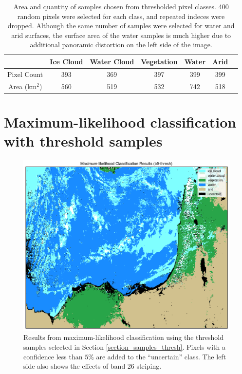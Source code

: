 \documentclass[12pt]{article}
\begin{document}
\begin{table}[h!]
    \centering
    \begin{tabular}{c|cccccc}
    & Ice Cloud & Water Cloud & Vegetation & Water & Arid \\
    \hline
    Pixel Count & 393 & 369 & 397 & 399 & 399\\
    Area (km$^2$) & 560 & 519 & 532 & 742 & 518\\
    \end{tabular}
    \caption{Area and quantity of samples chosen from thresholded pixel classes. 400 random pixels were selected for each class, and repeated indeces were dropped. Although the same number of samples were selected for water and arid surfaces, the surface area of the water samples is much higher due to additional panoramic distortion on the left side of the image.}
    \label{sample_thresh_areas}
\end{table}


\clearpage
\section{Maximum-likelihood classification with threshold samples}

\begin{figure}[h!]
    \centering

    \includegraphics[width=.85\textwidth]{figs/class/mlc_b9-thresh_6c.png}

    \caption{Results from maximum-likelihood classification using the threshold samples selected in Section \ref{section_samples_thresh}.  Pixels with a confidence less than $5\%$ are added to the ``uncertain'' class. The left side also shows the effects of band 26 striping.}
    \label{mlc_thresh_results}
\end{figure}
\end{document}
